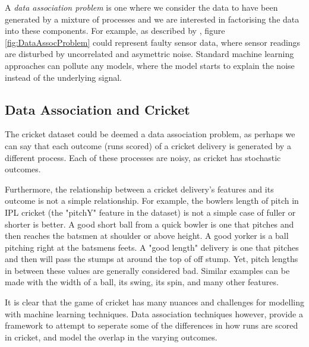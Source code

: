 \documentclass[12pt,a4paper]{report}
\theoremstyle{definition}
\begin{document}
A \emph{data association problem} is one where we consider the data to have been generated by a mixture of processes and we are interested in factorising the data into these components. 
For example, as described by \citet{Kaiser2018}, figure \ref{fig:DataAssocProblem} could represent faulty sensor data, where sensor readings are disturbed by uncorrelated and asymettric noise. 
Standard machine learning approaches can pollute any models, where the model starts to explain the noise instead of the underlying signal. 

\subsection{Data Association and Cricket}

The cricket dataset could be deemed a data association problem, as perhaps we can say that each outcome (runs scored) of a cricket delivery is generated by a different process. 
Each of these processes are noisy, as cricket has stochastic outcomes. 

Furthermore, the relationship between a cricket delivery's features and its outcome is not a simple relationship. 
For example, the bowlers length of pitch in IPL cricket (the "pitchY" feature in the dataset) is not a simple case of fuller or shorter is better.
A good short ball from a quick bowler is one that pitches and then reaches the batsmen at shoulder or above height. 
A good yorker is a ball pitching right at the batsmens feets. 
A "good length" delivery is one that pitches and then will pass the stumps at around the top of off stump.
Yet, pitch lengths in between these values are generally considered bad. 
Similar examples can be made with the width of a ball, its swing, its spin, and many other features.


It is clear that the game of cricket has many nuances and challenges for modelling with machine learning techniques. 
Data association techniques however, provide a framework to attempt to seperate some of the differences in how runs are scored in cricket, and model the overlap in the varying outcomes.
\end{document}
